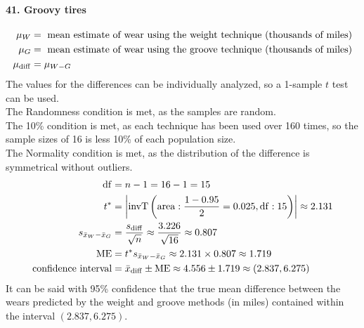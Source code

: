 \documentclass[../Homework]{subfiles}
\begin{document}
			\paragraph{41. Groovy tires}
				\begin{align*}
					\mu_W &= \text{ mean estimate of wear using the weight technique (thousands of miles)} \\
					\mu_G &= \text{ mean estimate of wear using the groove technique (thousands of miles)} \\
					\mu_{\mathrm{diff}} &= \mu_{W - G}
				\end{align*}
				The values for the differences can be individually analyzed, so a 1-sample $t$ test can be used. \\
				The Randomness condition is met, as the samples are random. \\
				The 10\% condition is met, as each technique has been used over 160 times, so the sample sizes of 16 is less 10\% of each population size. \\
				The Normality condition is met, as the distribution of the difference is symmetrical without outliers.
				\begin{align*}
					\operatorname{df} &= n - 1 = 16 - 1 = 15 \\
					t^* &= \left|\operatorname{invT}\left(\operatorname{area}: \frac{1 - 0.95}{2} = 0.025, \operatorname{df}: 15\right)\right| \approx 2.131 \\
					s_{\bar{x}_W - \bar{x}_G} &= \frac{s_{\mathrm{diff}}}{\sqrt{n}} \approx \frac{3.226}{\sqrt{16}} \approx 0.807 \\
					\operatorname{ME} &= t^*s_{\bar{x}_W - \bar{x}_G} \approx 2.131 \times 0.807 \approx 1.719 \\
					\text{confidence interval} &= \bar{x}_{\mathrm{diff}} \pm \operatorname{ME} \approx 4.556 \pm 1.719 \approx (2.837, 6.275)
				\end{align*}
				It can be said with 95\% confidence that the true mean difference between the wears predicted by the weight and groove methods (in miles) contained within the interval $(2.837, 6.275)$.
\end{document}
